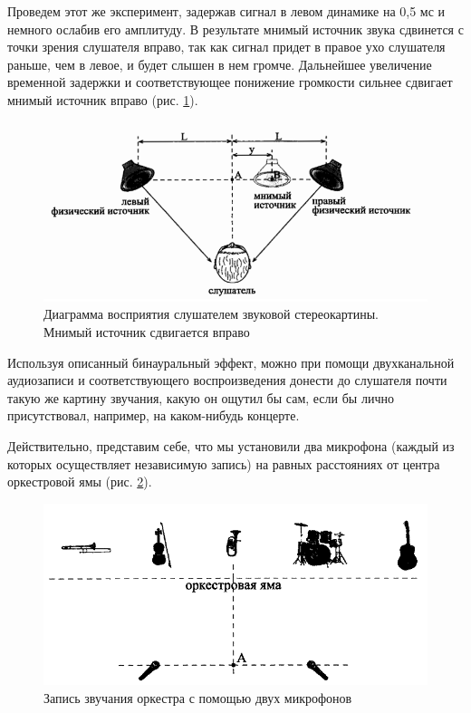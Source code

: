 \documentclass[oneside, final, 14pt]{extreport}
\begin{document}
Проведем этот же эксперимент, задержав сигнал в левом динамике на 0,5 мс и немного ослабив его амплитуду. В результате мнимый источник звука сдвинется с точки зрения слушателя вправо, так как сигнал придет в правое ухо слушателя раньше, чем в левое, и будет слышен в нем громче. Дальнейшее увеличение временной задержки и соответствующее понижение громкости сильнее сдвигает мнимый источник вправо (рис. \ref{pic-ear-16}).

\begin{figure}[h]
\centering
\includegraphics[scale=0.8]{pic-ear-16}
\caption{Диаграмма восприятия слушателем звуковой стереокартины. Мнимый источник сдвигается вправо}
\label{pic-ear-16}
\end{figure}

Используя описанный бинауральный эффект, можно при помощи двухканальной аудиозаписи и соответствующего воспроизведения донести до слушателя почти такую же картину звучания, какую он ощутил бы сам, если бы лично присутствовал, например, на каком-нибудь концерте. 

Действительно, представим себе, что мы установили два микрофона (каждый из которых осуществляет независимую запись) на равных расстояниях от центра оркестровой ямы (рис. \ref{pic-ear-17}).

\begin{figure}[h]
\centering
\includegraphics[scale=0.8]{pic-ear-17}
\caption{Запись звучания оркестра с помощью двух микрофонов}
\label{pic-ear-17}
\end{figure}
\end{document}
